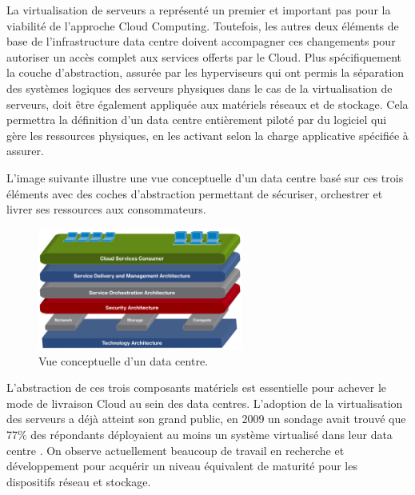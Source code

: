 La virtualisation de serveurs a représenté un premier et important pas pour la viabilité de l'approche Cloud Computing. Toutefois, les autres deux éléments de base de l'infrastructure data centre doivent accompagner ces changements pour autoriser un accès complet aux services offerts par le Cloud. Plus spécifiquement la couche d'abstraction, assurée par les hyperviseurs qui ont permis la séparation des systèmes logiques des serveurs physiques dans le cas de la virtualisation de serveurs, doit être également appliquée aux matériels réseaux et de stockage. Cela permettra la définition d'un data centre entièrement piloté par du logiciel qui gère les ressources physiques, en les activant selon la charge applicative spécifiée à assurer.

\pagebreak

 L'image suivante illustre une vue conceptuelle d'un data centre basé sur ces trois éléments avec des coches d'abstraction permettant de sécuriser, orchestrer et livrer ses ressources aux consommateurs.

\begin{figure}[h]
\begin{center}

\includegraphics[width=0.6\textwidth]{images/CloudRefArchi} 
\caption{Vue conceptuelle d'un data centre. \cite{ciscoCCDCStrategyArchiSolutions}} \label{cloud_conceptual_view}

\end{center}
\end{figure}

L'abstraction de ces trois composants matériels est essentielle pour achever le mode de livraison Cloud au sein des data centres. L'adoption de la virtualisation des serveurs a déjà atteint son grand public, en 2009 un sondage avait trouvé que 77\% des répondants déployaient au moins un système virtualisé dans leur data centre \cite{x86ServersVirtualization}. On observe actuellement beaucoup de travail en recherche et développement pour acquérir un niveau équivalent de maturité pour les dispositifs réseau et stockage. 

